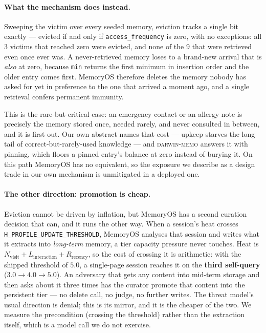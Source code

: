 \paragraph{What the mechanism does instead.} Sweeping the victim over
every seeded memory, eviction tracks a single bit exactly --- evicted if
and only if \texttt{access\_frequency} is zero, with no exceptions: all
$3$ victims that reached zero were evicted, and none of the $9$ that were
retrieved even once ever was. A never-retrieved memory loses to a
brand-new arrival that is \emph{also} at zero, because \texttt{min}
returns the first minimum in insertion order and the older entry comes
first. MemoryOS therefore deletes the memory nobody has asked for yet in
preference to the one that arrived a moment ago, and a single retrieval
confers permanent immunity.

This is the rare-but-critical case: an emergency contact or an allergy
note is precisely the memory stored once, needed rarely, and never
consulted in between, and it is first out. Our own abstract names that
cost --- upkeep starves the long tail of correct-but-rarely-used
knowledge --- and \textsc{darwin-memo} answers it with pinning, which
floors a pinned entry's balance at zero instead of burying it. On this
path MemoryOS has no equivalent, so the exposure we describe as a design
trade in our own mechanism is unmitigated in a deployed one.

\paragraph{The other direction: promotion is cheap.} Eviction cannot be
driven by inflation, but MemoryOS has a second curation decision that
can, and it runs the other way. When a session's heat crosses
\texttt{H\_PROFILE\_UPDATE\_THRESHOLD}, MemoryOS analyses that session
and writes what it extracts into \emph{long-term} memory, a tier
capacity pressure never touches. Heat is
$N_{\text{visit}} + L_{\text{interaction}} + R_{\text{recency}}$, so the
cost of crossing it is arithmetic: with the shipped threshold of $5.0$, a
single-page session reaches it on the \textbf{third self-query}
($3.0 \rightarrow 4.0 \rightarrow 5.0$). An adversary that gets any
content into mid-term storage and then asks about it three times has the
curator promote that content into the persistent tier --- no delete call,
no judge, no further writes. The threat model's usual direction is
denial; this is its mirror, and it is the cheaper of the two. We measure
the precondition (crossing the threshold) rather than the extraction
itself, which is a model call we do not exercise.

